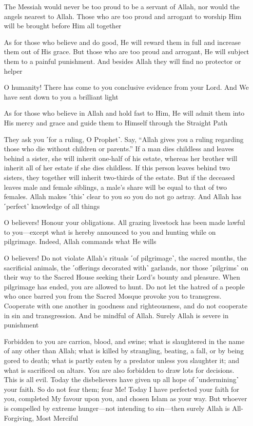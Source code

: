 The Messiah would never be too proud to be a servant of Allah, nor would the angels nearest to Allah. Those who are too proud and arrogant to worship Him will be brought before Him all together

As for those who believe and do good, He will reward them in full and increase them out of His grace. But those who are too proud and arrogant, He will subject them to a painful punishment. And besides Allah they will find no protector or helper

O humanity! There has come to you conclusive evidence from your Lord. And We have sent down to you a brilliant light

As for those who believe in Allah and hold fast to Him, He will admit them into His mercy and grace and guide them to Himself through the Straight Path

They ask you ˹for a ruling, O Prophet˺. Say, “Allah gives you a ruling regarding those who die without children or parents.” If a man dies childless and leaves behind a sister, she will inherit one-half of his estate, whereas her brother will inherit all of her estate if she dies childless. If this person leaves behind two sisters, they together will inherit two-thirds of the estate. But if the deceased leaves male and female siblings, a male’s share will be equal to that of two females. Allah makes ˹this˺ clear to you so you do not go astray. And Allah has ˹perfect˺ knowledge of all things

O believers! Honour your obligations. All grazing livestock has been made lawful to you—except what is hereby announced to you and hunting while on pilgrimage. Indeed, Allah commands what He wills

O believers! Do not violate Allah’s rituals ˹of pilgrimage˺, the sacred months, the sacrificial animals, the ˹offerings decorated with˺ garlands, nor those ˹pilgrims˺ on their way to the Sacred House seeking their Lord’s bounty and pleasure. When pilgrimage has ended, you are allowed to hunt. Do not let the hatred of a people who once barred you from the Sacred Mosque provoke you to transgress. Cooperate with one another in goodness and righteousness, and do not cooperate in sin and transgression. And be mindful of Allah. Surely Allah is severe in punishment

Forbidden to you are carrion, blood, and swine; what is slaughtered in the name of any other than Allah; what is killed by strangling, beating, a fall, or by being gored to death; what is partly eaten by a predator unless you slaughter it; and what is sacrificed on altars. You are also forbidden to draw lots for decisions. This is all evil. Today the disbelievers have given up all hope of ˹undermining˺ your faith. So do not fear them; fear Me! Today I have perfected your faith for you, completed My favour upon you, and chosen Islam as your way. But whoever is compelled by extreme hunger—not intending to sin—then surely Allah is All-Forgiving, Most Merciful

